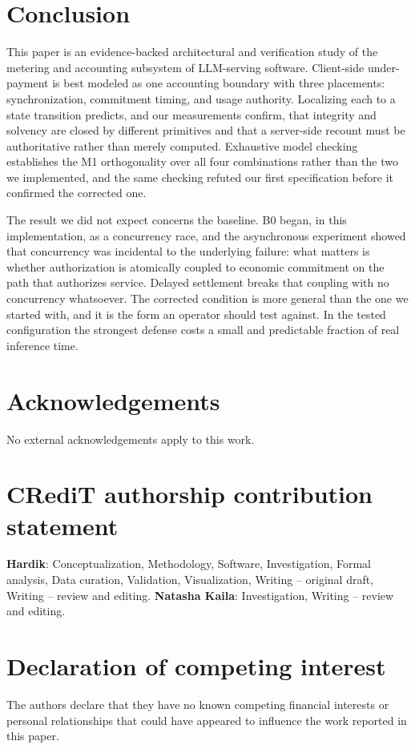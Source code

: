 \documentclass[preprint,3p,authoryear,12pt]{elsarticle}
\begin{document}
\section{Conclusion}
This paper is an evidence-backed architectural and verification study of the metering and
accounting subsystem of LLM-serving software. Client-side under-payment is best modeled as
one accounting boundary with three placements: synchronization, commitment timing, and
usage authority.
Localizing each to a state transition predicts, and our measurements confirm, that
integrity and solvency are closed by different primitives and that a server-side recount
must be authoritative rather than merely computed. Exhaustive model checking establishes
the M1 orthogonality over all four combinations rather than the two we implemented, and
the same checking refuted our first specification before it confirmed the corrected one.

The result we did not expect concerns the baseline. B0 began, in this implementation, as
a concurrency race, and the asynchronous experiment showed that concurrency was
incidental to the underlying failure: what matters is whether authorization is
atomically coupled to economic commitment on the path that authorizes service. Delayed
settlement breaks that coupling with no concurrency whatsoever. The corrected condition
is more general than the one we started with, and it is the form an operator should test
against. In the tested configuration the strongest defense costs a small and predictable
fraction of real inference time.

\section*{Acknowledgements}
No external acknowledgements apply to this work.

\section*{CRediT authorship contribution statement}
\textbf{Hardik}: Conceptualization, Methodology, Software, Investigation, Formal
analysis, Data curation, Validation, Visualization, Writing -- original draft, Writing --
review and editing. \textbf{Natasha Kaila}: Investigation, Writing -- review and editing.

\section*{Declaration of competing interest}
The authors declare that they have no known competing financial interests or personal
relationships that could have appeared to influence the work reported in this paper.
\end{document}
